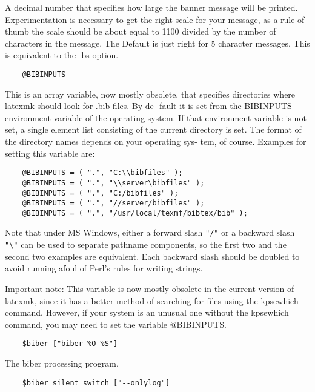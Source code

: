 A decimal number that specifies how  large  the  banner  message
will  be printed.  Experimentation is necessary to get the right
scale for your message, as a rule of thumb the scale  should  be
about  equal  to 1100 divided by the number of characters in the
message.  The Default is just right for  5  character  messages.
This is equivalent to the -bs option.

\begin{verbatim}
	@BIBINPUTS
\end{verbatim}

This  is  an array variable, now mostly obsolete, that specifies
directories where latexmk should look for .bib  files.   By  de-
fault  it  is set from the BIBINPUTS environment variable of the
operating system.  If that environment variable is  not  set,  a
single  element list consisting of the current directory is set.
The format of the directory names depends on your operating sys-
tem, of course.  Examples for setting this variable are:

\begin{verbatim}
	@BIBINPUTS = ( ".", "C:\\bibfiles" );
	@BIBINPUTS = ( ".", "\\server\bibfiles" );
	@BIBINPUTS = ( ".", "C:/bibfiles" );
	@BIBINPUTS = ( ".", "//server/bibfiles" );
	@BIBINPUTS = ( ".", "/usr/local/texmf/bibtex/bib" );
\end{verbatim}

Note  that  under  MS  Windows,  either a forward slash \verb|"/"| or a
backward slash \verb|"\"| can be used to separate pathname  components,
so  the  first  two  and the second two examples are equivalent.
Each backward slash should be doubled to avoid running afoul  of
Perl's rules for writing strings.

Important note: This variable is now mostly obsolete in the current version of
latexmk, since it has a better method of searching  for  files  using  the
kpsewhich command.  However, if your system is an unusual one without the
kpsewhich command, you  may need to set the variable @BIBINPUTS.

\begin{verbatim}
	$biber ["biber %O %S"]
\end{verbatim}

The biber processing program.

\begin{verbatim}
	$biber_silent_switch ["--onlylog"]
\end{verbatim}

